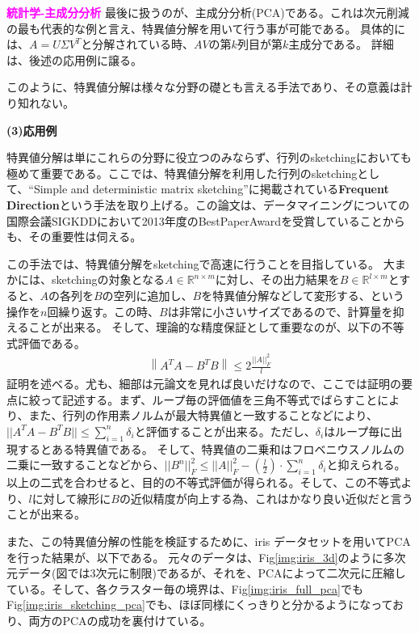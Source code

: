 \documentclass[10pt]{article}
\begin{document}
\noindent
{\bf \textcolor{magenta}{統計学-主成分分析}}\quad
最後に扱うのが、主成分分析(PCA)である。これは次元削減の最も代表的な例と言え、特異値分解を用いて行う事が可能である。
具体的には、$A=U\Sigma V^T$と分解されている時、$AV$の第$k$列目が第$k$主成分である\cite{GuanHuDetaFenXiJiChuZhuChengFenFenXi}。
詳細は、後述の応用例に譲る。

このように、特異値分解は様々な分野の礎とも言える手法であり、その意義は計り知れない。

\noindent
{\bf (3)応用例}

特異値分解は単にこれらの分野に役立つのみならず、行列のsketchingにおいても極めて重要である。ここでは、特異値分解を利用した行列のsketchingとして、``Simple and deterministic matrix sketching''に掲載されている\textbf{Frequent Direction}という手法を取り上げる\cite{libertySimpleDeterministicMatrix2013}。この論文は、データマイニングについての国際会議SIGKDDにおいて2013年度のBestPaperAwardを受賞していることからも、その重要性は伺える。

この手法では、特異値分解をsketchingで高速に行うことを目指している。
大まかには、sketchingの対象となる$A\in \mathbb{R}^{n \times m}$に対し、その出力結果を$B \in \mathbb{R}^{l \times m}$とすると、$A$の各列を$B$の空列に追加し、$B$を特異値分解などして変形する、という操作を$n$回繰り返す。この時、$B$は非常に小さいサイズであるので、計算量を抑えることが出来る。
そして、理論的な精度保証として重要なのが、以下の不等式評価である。
\begin{align*}
    \left\lVert  A^TA - B^TB \right\rVert \leq 2 \frac{||A||_F^2}{l}
\end{align*}
証明を述べる。尤も、細部は元論文を見れば良いだけなので、ここでは証明の要点に絞って記述する。まず、ループ毎の評価値を三角不等式でばらすことにより、また、行列の作用素ノルムが最大特異値と一致することなどにより、$||A^TA-B^TB|| \leq \sum_{i=1}^{n} \delta_i$と評価することが出来る。ただし、$\delta_i$はループ毎に出現するとある特異値である。
そして、特異値の二乗和はフロベニウスノルムの二乗に一致することなどから、$||B^n||_F^2 \leq ||A||_F^2-(\frac{l}{2}) \cdot \sum_{i=1}^n \delta_i$と抑えられる。
以上の二式を合わせると、目的の不等式評価が得られる。そして、この不等式より、$l$に対して線形に$B$の近似精度が向上する為、これはかなり良い近似だと言うことが出来る。

また、この特異値分解の性能を検証するために、iris データセットを用いてPCAを行った結果が、以下である。
元々のデータは、Fig\ref{img:iris_3d}のように多次元データ(図では3次元に制限)であるが、それを、PCAによって二次元に圧縮している。そして、各クラスター毎の境界は、Fig\ref{img:iris_full_pca}でもFig\ref{img:iris_sketching_pca}でも、ほぼ同様にくっきりと分かるようになっており、両方のPCAの成功を裏付けている。
\end{document}
